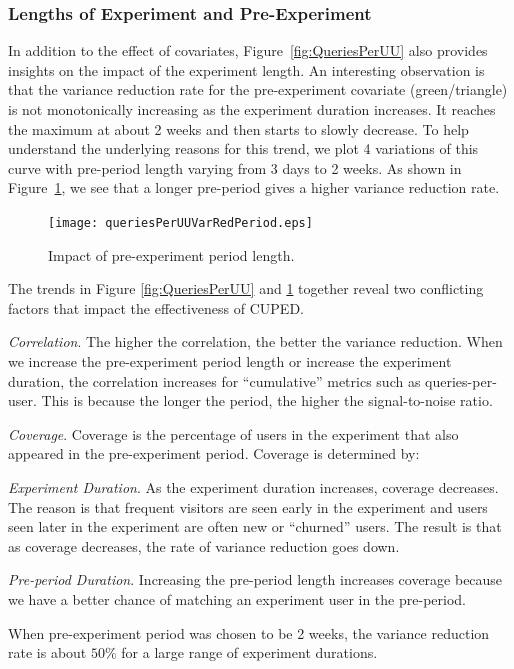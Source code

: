 \documentclass{sig-alternate}
\begin{document}
\subsubsection{Lengths of Experiment and Pre-Experiment}\label{sec:twoconflicting}
In addition to the effect of covariates, Figure~\ref{fig:QueriesPerUU} also provides insights on the impact of the experiment length.
An interesting observation is that the variance reduction rate for the pre-experiment covariate (green/triangle) is not monotonically increasing as the experiment duration increases. It reaches the maximum at about 2 weeks and then starts to slowly decrease. To help understand the underlying reasons for this trend, we plot 4 variations of this curve with pre-period length varying from 3 days to 2 weeks. As shown in Figure~\ref{fig:QueriesPerUUperiod}, we see that a longer pre-period gives a higher variance reduction rate. 
\begin{figure}[!hbtp]
  \centering
 \texttt{[image: queriesPerUUVarRedPeriod.eps]}
  \caption{Impact of pre-experiment period length.}
  \label{fig:QueriesPerUUperiod}
\end{figure}

The trends in Figure \ref{fig:QueriesPerUU} and \ref{fig:QueriesPerUUperiod} together reveal two conflicting factors that impact the effectiveness of CUPED.
\begin{compactitem}
\item \emph{Correlation}. The higher the correlation, the better the variance reduction. When we increase the pre-experiment period length or increase the experiment duration, the correlation increases for ``cumulative'' metrics such as queries-per-user. This is because the longer the period, the higher the signal-to-noise ratio.
\item \emph{Coverage}. Coverage is the percentage of users in the experiment that also appeared in the pre-experiment period. Coverage is determined by:
\begin{compactitem}
\item \emph{Experiment Duration}. As the experiment duration increases, coverage decreases. The reason is that frequent visitors are seen early in the experiment and users seen later in the experiment are often new or ``churned'' users. The result is that as coverage decreases, the rate of variance reduction goes down. 
\item \emph{Pre-period Duration}. Increasing the pre-period length increases coverage because we have a better chance of matching an experiment user in the pre-period.
\end{compactitem}
\end{compactitem}
When pre-experiment period was chosen to be 2 weeks, the variance reduction rate is about $50\%$ for a large range of experiment durations. 
\end{document}

